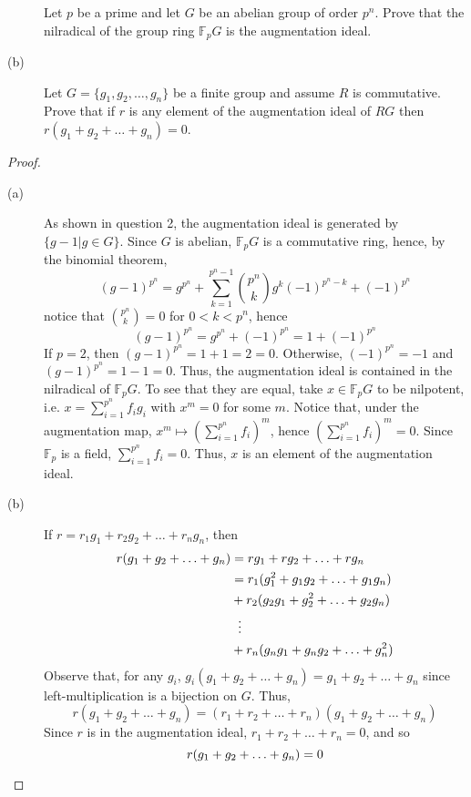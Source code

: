 \documentclass[12pt,leqno]{book}
\numberwithin{equation}{section}
\newcommand{\question}[2] {\vspace{.25in}\noindent\fbox{#1} #2 \vspace{.10in}}
\theoremstyle{definition}
\begin{document}
\question{3.}{ }\vspace{-.43in}\begin{description}
 \item [\hskip.3in(a)] Let $p$ be a prime and let $G$ be an abelian group of order $p^n$. Prove that the nilradical of the group ring $\mathbb{F}_pG$ is the augmentation ideal.
 \item [(b)] Let $G=\{g_1,g_2,\hdots,g_n\}$ be a finite group and assume $R$ is commutative. Prove that if $r$ is any element of the augmentation ideal of $RG$ then $r(g_1+g_2+\hdots+g_n)=0$.
\end{description}

\begin{proof}\indent
 \begin{description}
    \item [(a)] As shown in question 2, the augmentation ideal is generated by $\{g-1|g\in G\}$. Since $G$ is abelian, $\mathbb{F}_pG$ is a commutative ring, hence, by the binomial theorem, \[(g-1)^{p^n}=g^{p^n}+\sum_{k=1}^{p^n-1}{p^n\choose k}g^k(-1)^{p^n-k}+(-1)^{p^n}\] notice that ${p^n\choose k}=0$ for $0<k<p^n$, hence \[(g-1)^{p^n}=g^{p^n}+(-1)^{p^n}=1+(-1)^{p^n}\] If $p=2$, then $(g-1)^{p^n}=1+1=2=0$. Otherwise, $(-1)^{p^n}=-1$ and $(g-1)^{p^n}=1-1=0$. Thus, the augmentation ideal is contained in the nilradical of $\mathbb{F}_pG$. To see that they are equal, take $x\in\mathbb{F}_pG$ to be nilpotent, i.e. $x=\sum_{i=1}^{p^n} f_ig_i$ with $x^m=0$ for some $m$. Notice that, under the augmentation map, $x^m\mapsto\left(\sum_{i=1}^{p^n}f_i\right)^m$, hence $\left(\sum_{i=1}^{p^n}f_i\right)^m=0$. Since $\mathbb{F}_p$ is a field, $\sum_{i=1}^{p^n}f_i=0$. Thus, $x$ is an element of the augmentation ideal.
    \item [(b)] If $r=r_1g_1+r_2g_2+\hdots+r_ng_n$, then \begin{align*}r(g_1+g_2+\hdots+g_n)&=rg_1+rg_2+\hdots+rg_n\\&=r_1(g_1^2+g_1g_2+\hdots+g_1g_n)\\&+r_2(g_2g_1+g_2^2+\hdots+g_2g_n)\\&\hskip.08in\vdots\\&+r_n(g_ng_1+g_ng_2+\hdots+g_n^2)\end{align*} Observe that, for any $g_i$, $g_i(g_1+g_2+\hdots+g_n)=g_1+g_2+\hdots+g_n$ since left-multiplication is a bijection on $G$. Thus, \[r(g_1+g_2+\hdots+g_n)=(r_1+r_2+\hdots+r_n)(g_1+g_2+\hdots+g_n)\] Since $r$ is in the augmentation ideal, $r_1+r_2+\hdots+r_n=0$, and so \[r(g_1+g_2+\hdots+g_n)=0\qedhere\]
 \end{description}

\end{proof}
\end{document}
